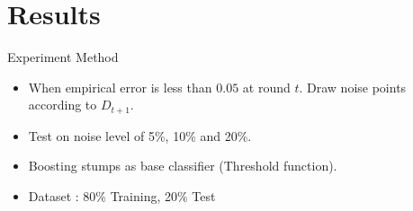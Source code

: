 \documentclass{beamer}
\begin{document}
\section{Results}

\begin{frame}{Experiment Method}
\begin{itemize}
\item
When empirical error is less than $0.05$ at round $t$.
Draw noise points according to $D_{t+1}$.
\item
Test on noise level of 5\%, 10\% and 20\%.
\item
Boosting stumps as base classifier (Threshold function).
\item
Dataset : 80\% Training, 20\% Test
\end{itemize}
\end{frame}
\end{document}
